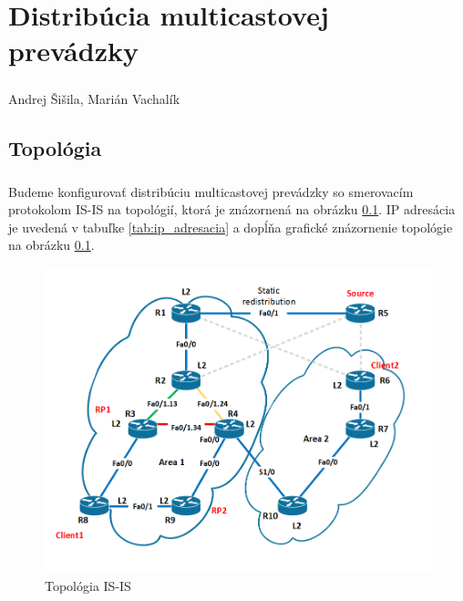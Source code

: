 \documentclass[12pt,twoside,a4paper]{report}
\begin{document}

\setcounter{chapter}{1}
\chapter*{Distribúcia multicastovej prevádzky}
\paragraph{}
Andrej Šišila, Marián Vachalík

\tableofcontents

\newpage
\section{Topológia}
\paragraph{}
Budeme konfigurovať distribúciu multicastovej prevádzky so smerovacím protokolom IS-IS na topológií, ktorá je znázornená na obrázku \ref{fig:mcast_isis_topo}. IP adresácia je uvedená v tabuľke \ref{tab:ip_adresacia} a dopĺňa grafické znázornenie topológie na obrázku \ref{fig:mcast_isis_topo}.

\begin{figure}[!htb]
\centering
\includegraphics[width=12cm,keepaspectratio]{mcast_isis_topo}
\caption{Topológia IS-IS}
\label{fig:mcast_isis_topo}
\end{figure}
\end{document}
